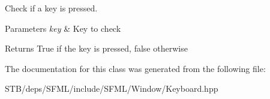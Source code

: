 Check if a key is pressed. 


\begin{DoxyParams}{Parameters}
{\em key} & Key to check\\
\hline
\end{DoxyParams}
\begin{DoxyReturn}{Returns}
True if the key is pressed, false otherwise 
\end{DoxyReturn}


The documentation for this class was generated from the following file\+:\begin{DoxyCompactItemize}
\item 
S\+T\+B/deps/\+S\+F\+M\+L/include/\+S\+F\+M\+L/\+Window/Keyboard.\+hpp\end{DoxyCompactItemize}
